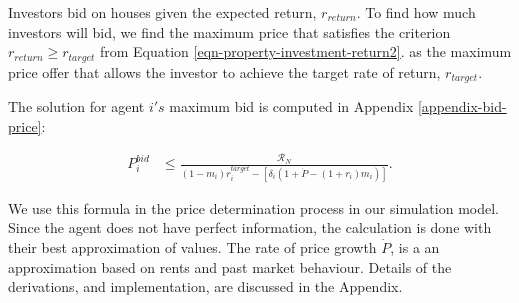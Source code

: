 Investors  bid on houses given the expected return, $r_{return}$. %
To find how much investors will bid, we find the maximum price that satisfies the criterion $r_{return} \geq r_{target}$ from Equation \ref{eqn-property-investment-return2}. %
as the maximum price offer that allows the investor to achieve the target rate of return, $r_{target}$.   %

The solution for agent $i's$ maximum bid is computed in Appendix \ref{appendix-bid-price}: 

\begin{align}
P_i^{bid} & \le   \frac{ \mathcal{R}_N}{(1-m_i)r_i^{target}-\left[ \delta_i(1 + \dot P - (1 + r_i)m_i)\right]}.
\label{eqn-bid1}
\end{align}

We use this formula in the price determination process in our simulation model. 
 Since the agent does not have perfect information, the calculation is done with their best approximation of values. %
 The rate of price growth $\dot P$, is a an approximation based on rents and past market behaviour. Details of the derivations, and implementation, are discussed in the Appendix. %

